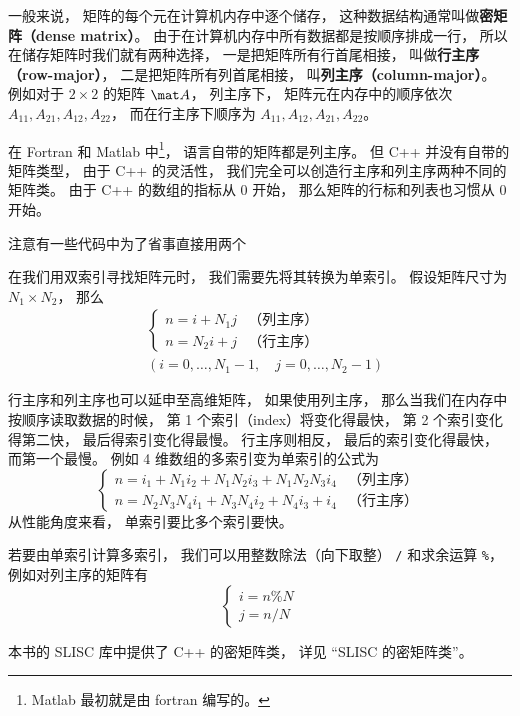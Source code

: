 

一般来说， 矩阵的每个元在计算机内存中逐个储存， 这种数据结构通常叫做\textbf{密矩阵（dense matrix）}。 由于在计算机内存中所有数据都是按顺序排成一行， 所以在储存矩阵时我们就有两种选择， 一是把矩阵所有行首尾相接， 叫做\textbf{行主序（row-major）}， 二是把矩阵所有列首尾相接， 叫\textbf{列主序（column-major）}。 例如对于 $2 \times 2$ 的矩阵 $\mat A$， 列主序下， 矩阵元在内存中的顺序依次 $A_{11}, A_{21}, A_{12}, A_{22}$， 而在行主序下顺序为 $A_{11},A_{12},A_{21},A_{22}$。

在 Fortran 和 Matlab 中\footnote{Matlab 最初就是由 fortran 编写的。}， 语言自带的矩阵都是列主序。 但 C++ 并没有自带的矩阵类型， 由于 C++ 的灵活性， 我们完全可以创造行主序和列主序两种不同的矩阵类。 由于 C++ 的数组的指标从 0 开始， 那么矩阵的行标和列表也习惯从 0 开始。

注意有一些代码中为了省事直接用两个

在我们用双索引寻找矩阵元时， 我们需要先将其转换为单索引。 假设矩阵尺寸为 $N_1 \times N_2$， 那么
\begin{equation}
\begin{aligned}
&\begin{cases}
n = i + N_1 j  &\text{（列主序）}\\
n = N_2 i + j  &\text{（行主序）}
\end{cases}\\
&(i = 0, \dots, N_1-1,\quad j = 0, \dots, N_2-1)
\end{aligned}
\end{equation}

行主序和列主序也可以延申至高维矩阵， 如果使用列主序， 那么当我们在内存中按顺序读取数据的时候， 第 1 个索引（index）将变化得最快， 第 2 个索引变化得第二快， 最后得索引变化得最慢。 行主序则相反， 最后的索引变化得最快， 而第一个最慢。 例如 4 维数组的多索引变为单索引的公式为
\begin{equation}
\begin{cases}
n = i_1 + N_1 i_2 + N_1 N_2 i_3 + N_1 N_2 N_3 i_4  &\text{（列主序）}\\
n = N_2 N_3 N_4 i_1 + N_3 N_4 i_2 + N_4 i_3 + i_4  &\text{（行主序）}
\end{cases}
\end{equation}
从性能角度来看， 单索引要比多个索引要快。

若要由单索引计算多索引， 我们可以用整数除法（向下取整） \verb|/| 和求余运算 \verb|%|， 例如对列主序的矩阵有
\begin{equation}
\begin{cases}
i = n \% N\\
j = n / N
\end{cases}
\end{equation}

本书的 SLISC 库中提供了 C++ 的密矩阵类， 详见 “SLISC 的密矩阵类”。
